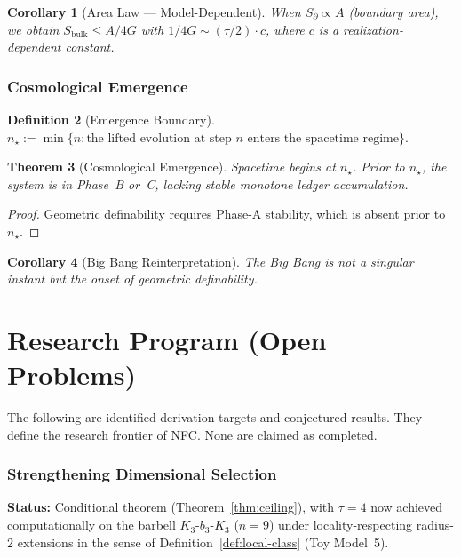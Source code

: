 \documentclass[11pt,a4paper]{article}
\newtheorem{theorem}{Theorem}[section]
\newtheorem{corollary}[theorem]{Corollary}
\theoremstyle{definition}
\newtheorem{definition}[theorem]{Definition}
\theoremstyle{remark}
\begin{document}
\begin{corollary}[Area Law --- Model-Dependent]\label{cor:area}
When $S_\partial \propto A$ (boundary area), we obtain $S_{\mathrm{bulk}} \leq A/4G$ with $1/4G \sim (\tau/2) \cdot c$, where $c$ is a realization-dependent constant.
\end{corollary}

\section{Cosmological Emergence}

\begin{definition}[Emergence Boundary]\label{def:emerge}
$n_\star := \min\{n : \text{the lifted evolution at step } n \text{ enters the spacetime regime}\}$.
\end{definition}

\begin{theorem}[Cosmological Emergence]\label{thm:cosmo}
Spacetime begins at $n_\star$. Prior to $n_\star$, the system is in Phase~B or~C, lacking stable monotone ledger accumulation.
\end{theorem}
\begin{proof}
Geometric definability requires Phase-A stability, which is absent prior to $n_\star$.
\end{proof}

\begin{corollary}[Big Bang Reinterpretation]\label{cor:bang}
The Big Bang is not a singular instant but the onset of geometric definability.
\end{corollary}


\part{Research Program (Open Problems)}

The following are identified derivation targets and conjectured results. They define the research frontier of NFC. None are claimed as completed.

\section{Strengthening Dimensional Selection}

\textbf{Status:} Conditional theorem (Theorem~\ref{thm:ceiling}), with $\tau = 4$ now achieved computationally on the barbell $K_3\text{-}b_3\text{-}K_3$ ($n = 9$) under locality-respecting radius-$2$ extensions in the sense of Definition~\ref{def:local-class} (Toy Model~5).
\end{document}
